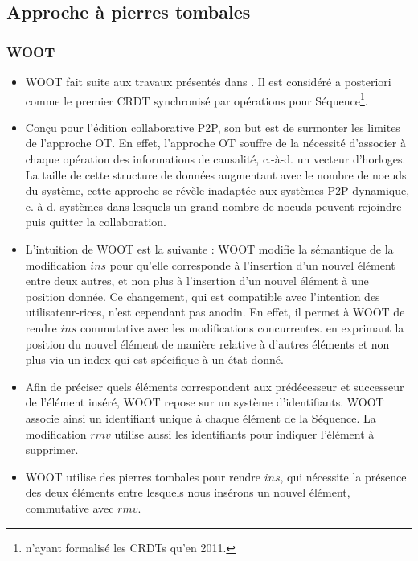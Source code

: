 \documentclass[12pt]{thesul}
\newcommand{\ie}{c.-à-d. }
\newcommand{\trm}[1]{\mathit{#1}}
\begin{document}
\subsection{Approche à pierres tombales}

\subsubsection{WOOT}

\begin{itemize}
  \item WOOT \cite{2006-woot-oster} fait suite aux travaux présentés dans \cite{2006-tombstone-transformation-functions-oster}.
    Il est considéré a posteriori comme le premier \ac{CRDT} synchronisé par opérations pour Séquence\footnote{\cite{shapiro_2011_crdt} n'ayant formalisé les \acp{CRDT} qu'en 2011.}.
  \item Conçu pour l'édition collaborative \ac{P2P}, son but est de surmonter les limites de l'approche \ac{OT}.
    En effet, l'approche \ac{OT} souffre de la nécessité d'associer à chaque opération des informations de causalité, \ie un vecteur d'horloges.
    La taille de cette structure de données augmentant avec le nombre de noeuds du système, cette approche se révèle inadaptée aux systèmes \ac{P2P} dynamique, \ie systèmes dans lesquels un grand nombre de noeuds peuvent rejoindre puis quitter la collaboration.
  \item L'intuition de WOOT est la suivante : WOOT modifie la sémantique de la modification $\trm{ins}$ pour qu'elle corresponde à l'insertion d'un nouvel élément entre deux autres, et non plus à l'insertion d'un nouvel élément à une position donnée.
    Ce changement, qui est compatible avec l'intention des utilisateur-rices, n'est cependant pas anodin.
    En effet, il permet à WOOT de rendre $\trm{ins}$ commutative avec les modifications concurrentes. en exprimant la position du nouvel élément de manière relative à d'autres éléments et non plus via un index qui est spécifique à un état donné.
  \item Afin de préciser quels éléments correspondent aux prédécesseur et successeur de l'élément inséré, WOOT repose sur un système d'identifiants.
    WOOT associe ainsi un identifiant unique à chaque élément de la Séquence.
    La modification $\trm{rmv}$ utilise aussi les identifiants pour indiquer l'élément à supprimer.
  \item WOOT utilise des pierres tombales pour rendre $\trm{ins}$, qui nécessite la présence des deux éléments entre lesquels nous insérons un nouvel élément, commutative avec $\trm{rmv}$.

\end{itemize}
\end{document}

